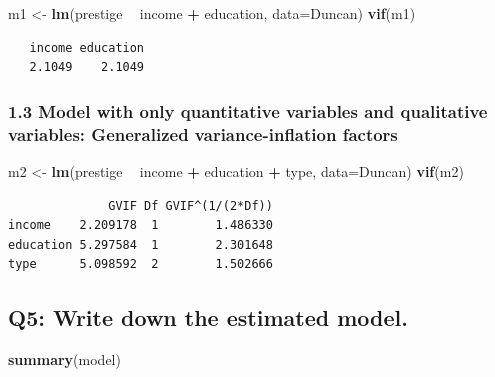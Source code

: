 \documentclass[]{article}
\newenvironment{Shaded}{\begin{snugshade}}{\end{snugshade}}
\newcommand{\DataTypeTok}[1]{\textcolor[rgb]{0.13,0.29,0.53}{#1}}
\newcommand{\KeywordTok}[1]{\textcolor[rgb]{0.13,0.29,0.53}{\textbf{#1}}}
\newcommand{\NormalTok}[1]{#1}
\newcommand{\OperatorTok}[1]{\textcolor[rgb]{0.81,0.36,0.00}{\textbf{#1}}}
\newcommand{\StringTok}[1]{\textcolor[rgb]{0.31,0.60,0.02}{#1}}
\begin{document}
\begin{Shaded}
\begin{Highlighting}[]
\NormalTok{m1 <-}\StringTok{ }\KeywordTok{lm}\NormalTok{(prestige }\OperatorTok{~}\StringTok{ }\NormalTok{income }\OperatorTok{+}\StringTok{ }\NormalTok{education, }\DataTypeTok{data=}\NormalTok{Duncan)}
\KeywordTok{vif}\NormalTok{(m1)}
\end{Highlighting}
\end{Shaded}

\begin{verbatim}
   income education 
   2.1049    2.1049 
\end{verbatim}

\hypertarget{model-with-only-quantitative-variables-and-qualitative-variables-generalized-variance-inflation-factors}{%
\subsubsection{1.3 Model with only quantitative variables and
qualitative variables: Generalized variance-inflation
factors}\label{model-with-only-quantitative-variables-and-qualitative-variables-generalized-variance-inflation-factors}}

\begin{Shaded}
\begin{Highlighting}[]
\NormalTok{m2 <-}\StringTok{ }\KeywordTok{lm}\NormalTok{(prestige }\OperatorTok{~}\StringTok{ }\NormalTok{income }\OperatorTok{+}\StringTok{ }\NormalTok{education }\OperatorTok{+}\StringTok{ }\NormalTok{type, }\DataTypeTok{data=}\NormalTok{Duncan)}
\KeywordTok{vif}\NormalTok{(m2)}
\end{Highlighting}
\end{Shaded}

\begin{verbatim}
              GVIF Df GVIF^(1/(2*Df))
income    2.209178  1        1.486330
education 5.297584  1        2.301648
type      5.098592  2        1.502666
\end{verbatim}

\newpage

\newpage

\hypertarget{q5-write-down-the-estimated-model.}{%
\subsection{Q5: Write down the estimated
model.}\label{q5-write-down-the-estimated-model.}}

\begin{Shaded}
\begin{Highlighting}[]
\KeywordTok{summary}\NormalTok{(model)}
\end{Highlighting}
\end{Shaded}
\end{document}

